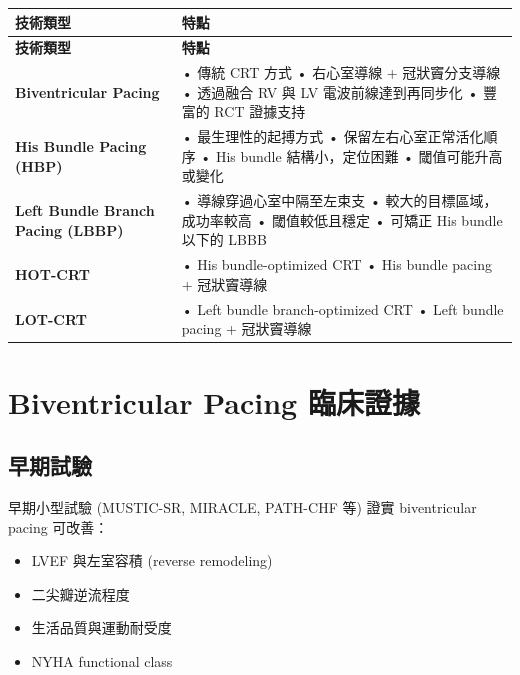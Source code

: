 \documentclass[12pt,a4paper]{article}
\begin{document}
\begin{longtable}{p{4cm}p{10cm}}
\toprule
\textbf{技術類型} & \textbf{特點} \\
\midrule
\endfirsthead
\toprule
\textbf{技術類型} & \textbf{特點} \\
\midrule
\endhead
\bottomrule
\endfoot

\textbf{Biventricular Pacing} &
• 傳統 CRT 方式\newline
• 右心室導線 + 冠狀竇分支導線\newline
• 透過融合 RV 與 LV 電波前線達到再同步化\newline
• 豐富的 RCT 證據支持 \\
\midrule

\textbf{His Bundle Pacing (HBP)} &
• 最生理性的起搏方式\newline
• 保留左右心室正常活化順序\newline
• His bundle 結構小，定位困難\newline
• 閾值可能升高或變化 \\
\midrule

\textbf{Left Bundle Branch Pacing (LBBP)} &
• 導線穿過心室中隔至左束支\newline
• 較大的目標區域，成功率較高\newline
• 閾值較低且穩定\newline
• 可矯正 His bundle 以下的 LBBB \\
\midrule

\textbf{HOT-CRT} &
• His bundle-optimized CRT\newline
• His bundle pacing + 冠狀竇導線 \\
\midrule

\textbf{LOT-CRT} &
• Left bundle branch-optimized CRT\newline
• Left bundle pacing + 冠狀竇導線 \\
\bottomrule
\end{longtable}

\section{Biventricular Pacing 臨床證據}

\subsection{早期試驗}

早期小型試驗 (MUSTIC-SR, MIRACLE, PATH-CHF 等) 證實 biventricular pacing 可改善：
\begin{itemize}
    \item LVEF 與左室容積 (reverse remodeling)
    \item 二尖瓣逆流程度
    \item 生活品質與運動耐受度
    \item NYHA functional class
\end{itemize}
\end{document}
